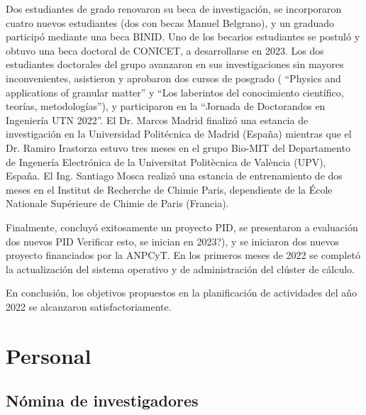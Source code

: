 \documentclass[a4paper,11pt,twoside,final,titlepage,onecolumn,openright]{report}
\begin{document}
Dos estudiantes de grado renovaron su beca de investigación, se incorporaron cuatro nuevos estudiantes (dos con becas Manuel Belgrano), y un graduado participó mediante una beca BINID. Uno de los becarios estudiantes se postuló y obtuvo una beca doctoral de CONICET, a desarrollarse en 2023. Los dos estudiantes doctorales del grupo avanzaron en sus investigaciones sin mayores inconvenientes, asistieron y aprobaron dos cursos de posgrado ( ``Physics and applications of granular matter'' y ``Los laberintos del conocimiento científico, teorías, metodologías''), y participaron en la ``Jornada de Doctorandos en Ingeniería UTN 2022''.  El Dr. Marcos Madrid finalizó una estancia de investigación en la Universidad Politécnica de Madrid (España) mientras que el Dr. Ramiro Irastorza estuvo tres meses en el grupo Bio-MIT del Departamento de Ingenería Electrónica de la Universitat Politècnica de València (UPV), España. El Ing. Santiago Mosca realizó una estancia de entrenamiento de dos meses en el Institut de Recherche de Chimie Paris, dependiente de la École Nationale Supérieure de Chimie de Paris (Francia).

Finalmente, concluyó exitosamente un proyecto PID, se presentaron a evaluación dos nuevos PID {\color{red} Verificar esto, se inician en 2023?)},  y se iniciaron dos nuevos proyecto financiados por la ANPCyT. En los primeros meses de 2022 se completó la actualización del sistema operativo y de administración del clúster de cálculo.

En conclusión, los objetivos propuestos en la planificación de actividades del año 2022 se alcanzaron satisfactoriamente.

\section{Personal}

\subsection{Nómina de investigadores}
\end{document}
